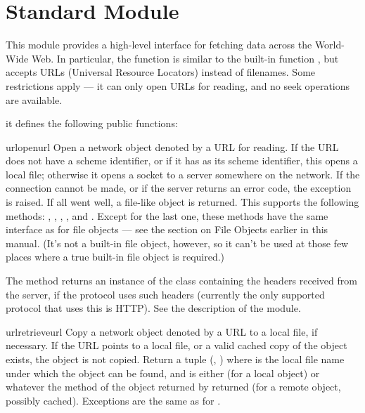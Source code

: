 \section{Standard Module }

\renewcommand{\indexsubitem}{(in module urllib)}

This module provides a high-level interface for fetching data across
the World-Wide Web.  In particular, the  function is
similar to the built-in function , but accepts URLs
(Universal Resource Locators) instead of filenames.  Some restrictions
apply --- it can only open URLs for reading, and no seek operations
are available.

it defines the following public functions:

\begin{funcdesc}{urlopen}{url}
Open a network object denoted by a URL for reading.  If the URL does
not have a scheme identifier, or if it has  as its scheme
identifier, this opens a local file; otherwise it opens a socket to a
server somewhere on the network.  If the connection cannot be made, or
if the server returns an error code, the  exception is
raised.  If all went well, a file-like object is returned.  This
supports the following methods: , ,
, ,  and .
Except for the last one, these methods have the same interface as for
file objects --- see the section on File Objects earlier in this
manual.  (It's not a built-in file object, however, so it can't be
used at those few places where a true built-in file object is
required.)

The  method returns an instance of the class
 containing the headers received from the server,
if the protocol uses such headers (currently the only supported
protocol that uses this is HTTP).  See the description of the
 module.
\end{funcdesc}

\begin{funcdesc}{urlretrieve}{url}
Copy a network object denoted by a URL to a local file, if necessary.
If the URL points to a local file, or a valid cached copy of the
object exists, the object is not copied.  Return a tuple (,
) where  is the local file name under which
the object can be found, and  is either  (for
a local object) or whatever the  method of the object
returned by  returned (for a remote object, possibly
cached).  Exceptions are the same as for .
\end{funcdesc}

